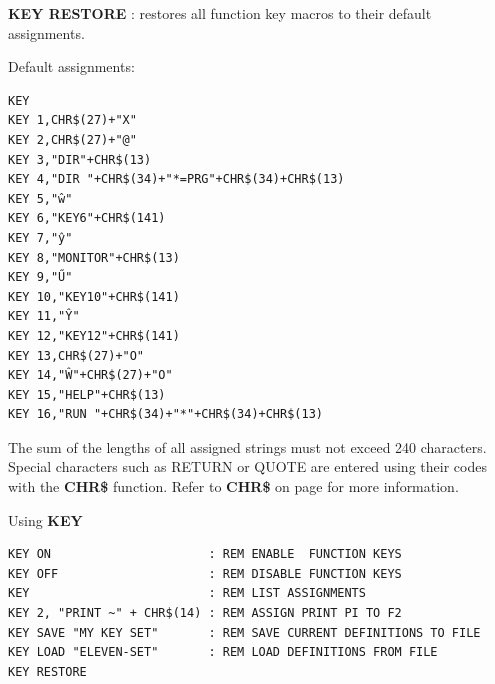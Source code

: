 \begin{description}[leftmargin=2cm,style=nextline]
                  {\bf KEY RESTORE} : restores all function key macros to their default assignments.

                  Default assignments:

\begin{tcolorbox}[colback=black,coltext=white]
\verbatimfont{\codefont}
\begin{verbatim}
KEY
KEY 1,CHR$(27)+"X"
KEY 2,CHR$(27)+"@"
KEY 3,"DIR"+CHR$(13)
KEY 4,"DIR "+CHR$(34)+"*=PRG"+CHR$(34)+CHR$(13)
KEY 5,"ŵ"
KEY 6,"KEY6"+CHR$(141)
KEY 7,"ŷ"
KEY 8,"MONITOR"+CHR$(13)
KEY 9,"Ű"
KEY 10,"KEY10"+CHR$(141)
KEY 11,"Ŷ"
KEY 12,"KEY12"+CHR$(141)
KEY 13,CHR$(27)+"O"
KEY 14,"Ŵ"+CHR$(27)+"O"
KEY 15,"HELP"+CHR$(13)
KEY 16,"RUN "+CHR$(34)+"*"+CHR$(34)+CHR$(13)
\end{verbatim}
\end{tcolorbox}

\item [Remarks:]  The sum of the lengths of all assigned strings must not exceed 240 characters. Special characters such as RETURN or QUOTE are entered using their codes with the {\bf CHR\$} function. Refer to {\bf CHR\$} on page \pageref{BASIC 65 Functions!CHR} for more information.

\item [Examples:] Using {\bf KEY}

\begin{tcolorbox}[colback=black,coltext=white]
\verbatimfont{\codefont}
\begin{verbatim}
KEY ON                      : REM ENABLE  FUNCTION KEYS
KEY OFF                     : REM DISABLE FUNCTION KEYS
KEY                         : REM LIST ASSIGNMENTS
KEY 2, "PRINT ~" + CHR$(14) : REM ASSIGN PRINT PI TO F2
KEY SAVE "MY KEY SET"       : REM SAVE CURRENT DEFINITIONS TO FILE
KEY LOAD "ELEVEN-SET"       : REM LOAD DEFINITIONS FROM FILE
KEY RESTORE
\end{verbatim}
\end{tcolorbox}
\end{description}


\newpage
